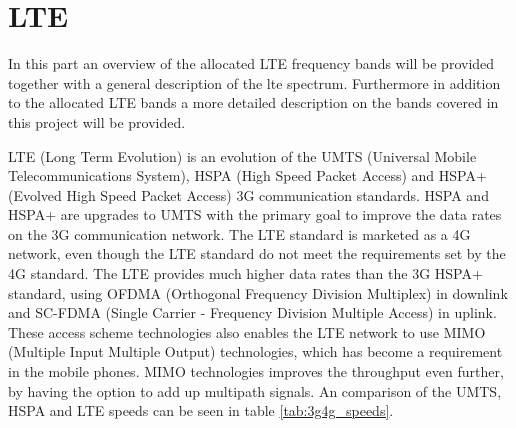 \section{LTE}
In this part an overview of the allocated LTE frequency bands will be provided together with a general description of the lte spectrum.
Furthermore in addition to the allocated LTE bands a more detailed description on the bands covered in this project will be provided.

LTE (Long Term Evolution) is an evolution of the UMTS (Universal Mobile Telecommunications System), HSPA (High Speed Packet Access) and HSPA+ (Evolved High Speed Packet Access) 3G communication standards. HSPA and HSPA+ are upgrades to UMTS with the primary goal to improve the data rates on the 3G communication network. The LTE standard is marketed as a 4G network, even though the LTE standard do not meet the requirements set by the 4G standard.
The LTE provides much higher data rates than the 3G HSPA+ standard, using OFDMA (Orthogonal Frequency Division Multiplex) in downlink and SC-FDMA (Single Carrier - Frequency Division Multiple Access) in uplink. These access scheme technologies also enables the LTE network to use MIMO (Multiple Input Multiple Output) technologies, which has become a requirement in the mobile phones.
MIMO technologies improves the throughput even further, by having the option to add up multipath signals. An comparison of the UMTS, HSPA and LTE speeds can be seen in table \ref{tab:3g4g_speeds}. \cite{radio2015electronics} 

